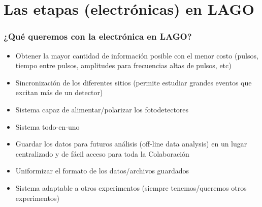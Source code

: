 \documentclass{beamer}
\begin{document}
%
%

\section{Las etapas (electrónicas) en LAGO}

\begin{frame}
	\frametitle{¿Qué queremos con la electrónica en LAGO?}
		\begin{block}{}
    	\begin{itemize}
      	\item Obtener la mayor cantidad de información
							posible con el menor costo (pulsos, tiempo
							entre pulsos, amplitudes para frecuencias
							altas de pulsos, etc) 
											\pause
      	\item Sincronización de los diferentes sitios (permite estudiar grandes
							eventos que excitan más de un detector)
											\pause
      	\item Sistema capaz de alimentar/polarizar los fotodetectores
											\pause
      	\item Sistema todo-en-uno
											\pause
        \item Guardar los datos para futuros análisis (off-line data analysis)
              en un lugar centralizado y de fácil acceso para toda la
							Colaboración
											\pause
							\item \alert{Uniformizar el formato de los datos/archivos
											guardados}
											\pause
      	\item Sistema adaptable a otros experimentos (siempre tenemos/queremos
							otros experimentos)

    	\end{itemize}
		\end{block}
\end{frame} 
\end{document}
